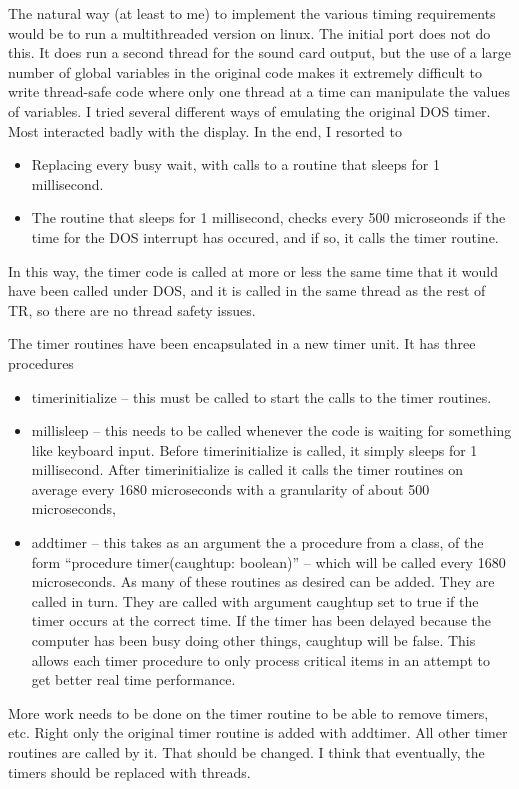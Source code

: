 \documentclass[12pt]{article}
\begin{document}
The natural way (at least to me) to implement the various timing requirements
would be to run a multithreaded version on linux. The initial port does
not do this. It does run a second thread for the sound card output, but
the use of a large number of global variables in the original code makes
it extremely difficult to write thread-safe code where only one thread
at a time can manipulate the values of variables. I tried several different
ways of emulating the original DOS timer. Most interacted badly with
the display. In the end, I resorted to
\begin{itemize}
\item
Replacing every busy wait, with calls to a routine that sleeps for
1 millisecond.
\item
The routine that sleeps for 1 millisecond, checks every 500 microseonds
if the time for the DOS interrupt has occured, and if so, it calls
the timer routine.
\end{itemize}
In this way, the timer code is called at more or less the same
time that it would have been called under DOS, and it is called in the
same thread as the rest of TR, so there are no thread safety issues.

The timer routines have been encapsulated in a new timer unit. It has
three procedures
\begin{itemize}
\item
timerinitialize -- this must be called to start the calls to the
timer routines.
\item
millisleep -- this needs to be called whenever the code is waiting for
something like keyboard input. Before timerinitialize is called, it
simply sleeps for 1 millisecond. After timerinitialize is
called it calls the timer routines on
average every 1680 microseconds with a granularity of about 500 microseconds,
\item
addtimer -- this takes as an argument the a procedure from a class, of the
form ``procedure timer(caughtup: boolean)'' -- which will be called
every 1680 microseconds. As many of these routines as desired can be added.
They are called in turn. They are called with argument caughtup set to true
if the timer occurs at the correct time. If the timer has been delayed
because the computer has been busy doing other things, caughtup will be
false. This allows each timer procedure to only process critical items
in an attempt to get better real time performance.
\end{itemize}
More work needs to be done on the timer routine to be able to remove
timers, etc. Right only the original timer routine is added with addtimer.
All other timer routines are called by it. That should be changed.
I think that eventually, the timers should be replaced
with threads.
\end{document}
